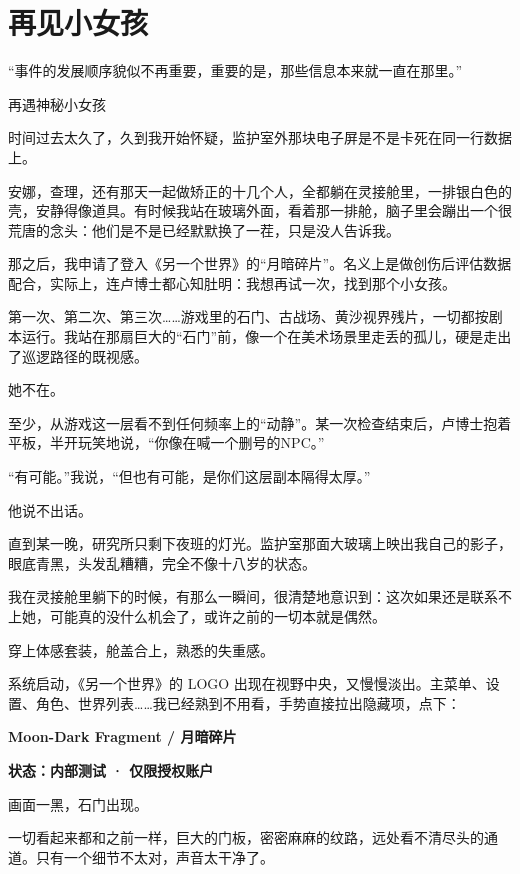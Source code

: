 \chapter{再见小女孩}

“事件的发展顺序貌似不再重要，重要的是，那些信息本来就一直在那里。”

再遇神秘小女孩

时间过去太久了，久到我开始怀疑，监护室外那块电子屏是不是卡死在同一行数据上。

安娜，查理，还有那天一起做矫正的十几个人，全都躺在灵接舱里，一排银白色的壳，安静得像道具。有时候我站在玻璃外面，看着那一排舱，脑子里会蹦出一个很荒唐的念头：他们是不是已经默默换了一茬，只是没人告诉我。

那之后，我申请了登入《另一个世界》的“月暗碎片”。名义上是做创伤后评估数据配合，实际上，连卢博士都心知肚明：我想再试一次，找到那个小女孩。

第一次、第二次、第三次……游戏里的石门、古战场、黄沙视界残片，一切都按剧本运行。我站在那扇巨大的“石门”前，像一个在美术场景里走丢的孤儿，硬是走出了巡逻路径的既视感。

她不在。

至少，从游戏这一层看不到任何频率上的“动静”。某一次检查结束后，卢博士抱着平板，半开玩笑地说，“你像在喊一个删号的NPC。”

“有可能。”我说，“但也有可能，是你们这层副本隔得太厚。”

他说不出话。

直到某一晚，研究所只剩下夜班的灯光。监护室那面大玻璃上映出我自己的影子，眼底青黑，头发乱糟糟，完全不像十八岁的状态。

我在灵接舱里躺下的时候，有那么一瞬间，很清楚地意识到：这次如果还是联系不上她，可能真的没什么机会了，或许之前的一切本就是偶然。

穿上体感套装，舱盖合上，熟悉的失重感。

系统启动，《另一个世界》的 LOGO 出现在视野中央，又慢慢淡出。主菜单、设置、角色、世界列表……我已经熟到不用看，手势直接拉出隐藏项，点下：

\begin{center}
\textbf{Moon-Dark Fragment / 月暗碎片}
\end{center}

\begin{center}
\textbf{状态：内部测试 · 仅限授权账户}
\end{center}

画面一黑，石门出现。

一切看起来都和之前一样，巨大的门板，密密麻麻的纹路，远处看不清尽头的通道。只有一个细节不太对，声音太干净了。

